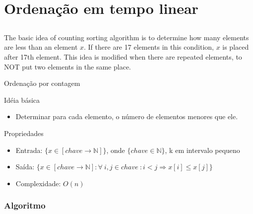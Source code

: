 \section{Ordenação em tempo linear}


\begin{frame}[plain]
\title{\insertlecture}
\maketitle
\end{frame}

\subsection{\insertlecture}

The basic idea of counting sorting algorithm is to determine how many
elements are less than an element $x$. If there are 17 elements in
this condition, $x$ is placed after 17th element. This idea is
modified when there are repeated elements, to NOT put two elements in
the same place.

\begin{frame}{Ordenação por contagem}

\begin{block}{Idéia básica}
\begin{itemize}
\item Determinar para cada elemento, o número de elementos menores que
ele.
\end{itemize}
\end{block}

\begin{block}{Propriedades}
\begin{itemize}
\item Entrada: $\{ x \in [chave \rightarrow \mathbb{N}]\}$, onde $\{chave
\in \mathbb{N}\}$, k em intervalo pequeno
\item Saída: $\{x \in [chave \rightarrow \mathbb{N}] : \forall\ i,j \in chave\ : i < j \Rightarrow x[i] \leq x[j] \}$
\item Complexidade: $O(n)$
\end{itemize}
\end{block}
\end{frame}

\subsubsection{Algoritmo}

